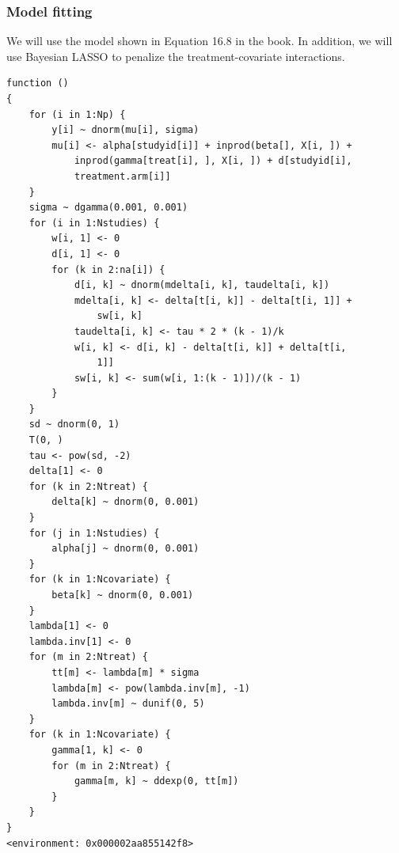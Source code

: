 \documentclass[
  letterpaper,
  DIV=11,
  numbers=noendperiod]{scrreprt}
\newenvironment{Shaded}{\begin{snugshade}}{\end{snugshade}}
\newcommand{\AttributeTok}[1]{\textcolor[rgb]{0.40,0.45,0.13}{#1}}
\newcommand{\FunctionTok}[1]{\textcolor[rgb]{0.28,0.35,0.67}{#1}}
\newcommand{\NormalTok}[1]{\textcolor[rgb]{0.00,0.23,0.31}{#1}}
\newcommand{\OtherTok}[1]{\textcolor[rgb]{0.00,0.23,0.31}{#1}}
\newcommand{\SpecialCharTok}[1]{\textcolor[rgb]{0.37,0.37,0.37}{#1}}
\newcommand{\StringTok}[1]{\textcolor[rgb]{0.13,0.47,0.30}{#1}}
\begin{document}
\hypertarget{model-fitting-2}{%
\subsubsection{Model fitting}\label{model-fitting-2}}

We will use the model shown in Equation 16.8 in the book. In addition,
we will use Bayesian LASSO to penalize the treatment-covariate
interactions.

\begin{Shaded}
\end{Shaded}

\begin{verbatim}
function () 
{
    for (i in 1:Np) {
        y[i] ~ dnorm(mu[i], sigma)
        mu[i] <- alpha[studyid[i]] + inprod(beta[], X[i, ]) + 
            inprod(gamma[treat[i], ], X[i, ]) + d[studyid[i], 
            treatment.arm[i]]
    }
    sigma ~ dgamma(0.001, 0.001)
    for (i in 1:Nstudies) {
        w[i, 1] <- 0
        d[i, 1] <- 0
        for (k in 2:na[i]) {
            d[i, k] ~ dnorm(mdelta[i, k], taudelta[i, k])
            mdelta[i, k] <- delta[t[i, k]] - delta[t[i, 1]] + 
                sw[i, k]
            taudelta[i, k] <- tau * 2 * (k - 1)/k
            w[i, k] <- d[i, k] - delta[t[i, k]] + delta[t[i, 
                1]]
            sw[i, k] <- sum(w[i, 1:(k - 1)])/(k - 1)
        }
    }
    sd ~ dnorm(0, 1)
    T(0, )
    tau <- pow(sd, -2)
    delta[1] <- 0
    for (k in 2:Ntreat) {
        delta[k] ~ dnorm(0, 0.001)
    }
    for (j in 1:Nstudies) {
        alpha[j] ~ dnorm(0, 0.001)
    }
    for (k in 1:Ncovariate) {
        beta[k] ~ dnorm(0, 0.001)
    }
    lambda[1] <- 0
    lambda.inv[1] <- 0
    for (m in 2:Ntreat) {
        tt[m] <- lambda[m] * sigma
        lambda[m] <- pow(lambda.inv[m], -1)
        lambda.inv[m] ~ dunif(0, 5)
    }
    for (k in 1:Ncovariate) {
        gamma[1, k] <- 0
        for (m in 2:Ntreat) {
            gamma[m, k] ~ ddexp(0, tt[m])
        }
    }
}
<environment: 0x000002aa855142f8>
\end{verbatim}
\end{document}
